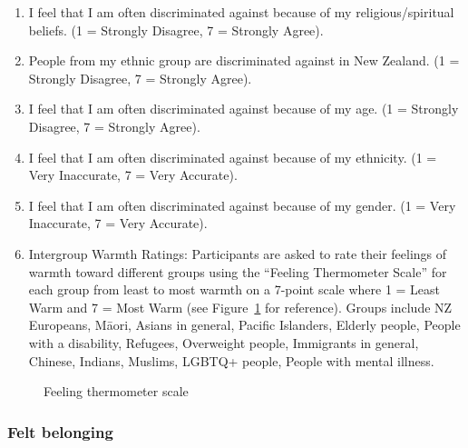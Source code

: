 \documentclass[
]{interact}
\providecommand{\tightlist}{%
  \setlength{\itemsep}{0pt}\setlength{\parskip}{0pt}}\usepackage{longtable,booktabs,array}
\begin{document}
\begin{enumerate}
\def\labelenumi{\arabic{enumi}.}
\tightlist
\item
  I feel that I am often discriminated against because of my
  religious/spiritual beliefs. (1 = Strongly Disagree, 7 = Strongly
  Agree).
\item
  People from my ethnic group are discriminated against in New Zealand.
  (1 = Strongly Disagree, 7 = Strongly Agree).
\item
  I feel that I am often discriminated against because of my age. (1 =
  Strongly Disagree, 7 = Strongly Agree).
\item
  I feel that I am often discriminated against because of my ethnicity.
  (1 = Very Inaccurate, 7 = Very Accurate).
\item
  I feel that I am often discriminated against because of my gender. (1
  = Very Inaccurate, 7 = Very Accurate).
\item
  Intergroup Warmth Ratings: Participants are asked to rate their
  feelings of warmth toward different groups using the ``Feeling
  Thermometer Scale'' for each group from least to most warmth on a
  7-point scale where 1 = Least Warm and 7 = Most Warm (see
  Figure~\ref{fig-warmth} for reference). Groups include NZ Europeans,
  Māori, Asians in general, Pacific Islanders, Elderly people, People
  with a disability, Refugees, Overweight people, Immigrants in general,
  Chinese, Indians, Muslims, LGBTQ+ people, People with mental illness.
\end{enumerate}

\begin{figure}


\caption{\label{fig-warmth}Feeling thermometer scale}

\end{figure}%

\subsubsection{Felt belonging}\label{felt-belonging}
\end{document}
